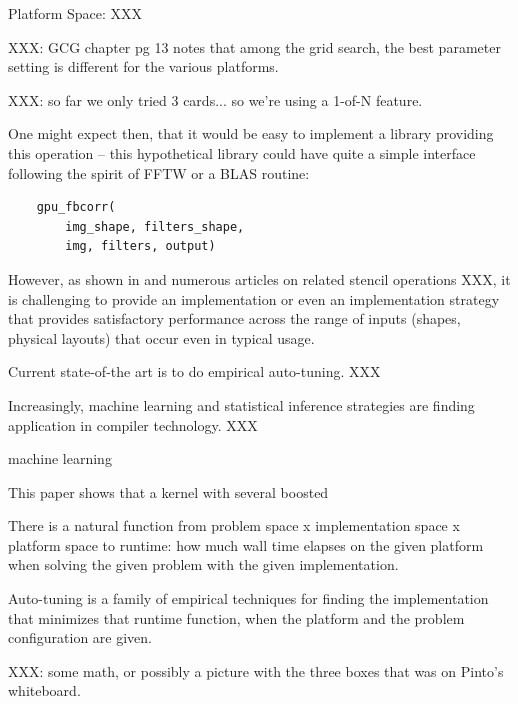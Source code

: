 \documentclass{sig-alternate}
\begin{document}
Platform Space: XXX

XXX: GCG chapter pg 13 notes that among the grid search, the best parameter
setting is different for the various platforms.

XXX: so far we only tried 3 cards... so we're using a 1-of-N feature.





One might expect then, that it would be easy to implement a library providing
this operation -- this hypothetical library could have quite a simple interface
following the spirit of FFTW or a BLAS routine:
\begin{verbatim}
    gpu_fbcorr(
        img_shape, filters_shape,
        img, filters, output)
\end{verbatim}
However, as shown in \citet{pinto+cox:2011gcg} and numerous articles on
related stencil operations XXX, it is challenging to provide an implementation
or even an implementation strategy that provides satisfactory performance
across the range of inputs (shapes, physical layouts) that occur even in
typical usage.

Current state-of-the art is to do empirical auto-tuning.
XXX \vspace{12pt}

Increasingly, machine learning and statistical inference strategies are
finding application in compiler technology.
XXX \vspace{12pt}

machine learning

This paper shows that a kernel with several  boosted


There is a natural function from
problem space x implementation space x platform space to runtime:
how much wall time elapses on the given platform when solving the given
problem with the given implementation.

Auto-tuning is a family of empirical techniques for finding the implementation
that minimizes that runtime function, when the platform and the problem
configuration are given.

XXX: some math, or possibly a picture with the three boxes that was on Pinto's
whiteboard.
\end{document}
